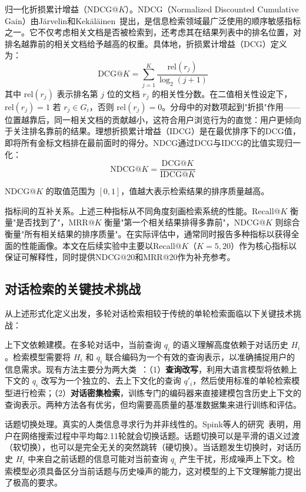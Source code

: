 归一化折损累计增益（NDCG@$K$）。NDCG（Normalized Discounted Cumulative Gain）由Järvelin和Kekäläinen~\citep{jarvelin2002cumulated}提出，是信息检索领域最广泛使用的顺序敏感指标之一。它不仅考虑相关文档是否被检索到，还考虑其在结果列表中的排名位置，对排名越靠前的相关文档给予越高的权重。具体地，折损累计增益（DCG）定义为：
\begin{equation}
    \text{DCG@}K = \sum_{j=1}^{K} \frac{\text{rel}(r_j)}{\log_2(j + 1)}
\end{equation}
其中 $\text{rel}(r_j)$ 表示排名第 $j$ 位的文档 $r_j$ 的相关性分数。在二值相关性设定下，$\text{rel}(r_j) = 1$ 若 $r_j \in G_i$，否则 $\text{rel}(r_j) = 0$。分母中的对数项起到"折损"作用——位置越靠后，同一相关文档的贡献越小，这符合用户浏览行为的直觉：用户更倾向于关注排名靠前的结果。理想折损累计增益（IDCG）是在最优排序下的DCG值，即将所有金标文档排在最前面时的得分。NDCG通过DCG与IDCG的比值实现归一化：
\begin{equation}
    \text{NDCG@}K = \frac{\text{DCG@}K}{\text{IDCG@}K}
\end{equation}

NDCG@$K$ 的取值范围为 $[0, 1]$，值越大表示检索结果的排序质量越高。

指标间的互补关系。上述三种指标从不同角度刻画检索系统的性能。Recall@$K$ 衡量"是否找到了"，MRR@$K$ 衡量"第一个相关结果排得多靠前"，NDCG@$K$ 则综合衡量"所有相关结果的排序质量"。在实际评估中，通常同时报告多种指标以获得全面的性能画像。本文在后续实验中主要以Recall@$K$（$K=5, 20$）作为核心指标以保证可解释性，同时提供NDCG@20和MRR@20作为补充参考。

\subsection{对话检索的关键技术挑战}

从上述形式化定义出发，多轮对话检索相较于传统的单轮检索面临以下关键技术挑战：

上下文依赖建模。在多轮对话中，当前查询 $q_i$ 的语义理解高度依赖于对话历史 $H_i$。检索模型需要将 $H_i$ 和 $q_i$ 联合编码为一个有效的查询表示，以准确捕捉用户的信息需求。现有方法主要分为两大类~\citep{mo2025survey}：（1）\textbf{查询改写}，利用大语言模型将依赖上下文的 $q_i$ 改写为一个独立的、去上下文化的查询 $q'_i$，然后使用标准的单轮检索模型进行检索；（2）\textbf{对话密集检索}，训练专门的编码器来直接建模包含历史上下文的查询表示。两种方法各有优劣，但均需要高质量的基准数据集来进行训练和评估。

话题切换处理。真实的人类信息寻求行为并非线性的。Spink等人的研究~\citep{spink2002multitasking}表明，用户在网络搜索过程中平均每2.11轮就会切换话题。话题切换可以是平滑的语义过渡（软切换），也可以是完全无关的突然跳转（硬切换）。当话题发生切换时，对话历史 $H_i$ 中来自之前话题的信息可能对当前查询 $q_i$ 产生干扰，形成噪声上下文。检索模型必须具备区分当前话题与历史噪声的能力，这对模型的上下文理解能力提出了极高的要求。

